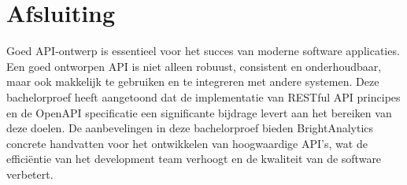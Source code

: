 \section{Afsluiting}

Goed API-ontwerp is essentieel voor het succes van moderne software applicaties. Een goed ontworpen API is niet alleen robuust, consistent en onderhoudbaar, maar ook makkelijk te gebruiken en te integreren met andere systemen. Deze bachelorproef heeft aangetoond dat de implementatie van RESTful API principes en de OpenAPI specificatie een significante bijdrage levert aan het bereiken van deze doelen. De aanbevelingen in deze bachelorproef bieden BrightAnalytics concrete handvatten voor het ontwikkelen van hoogwaardige API's, wat de efficiëntie van het development team verhoogt en de kwaliteit van de software verbetert.
